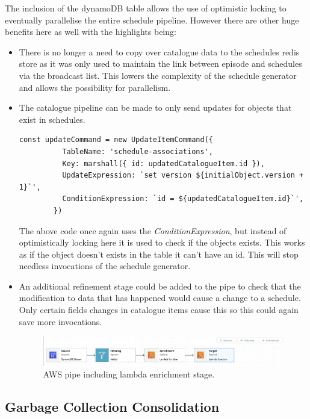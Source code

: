   The inclusion of the dynamoDB table allows the use of optimistic locking to eventually parallelise the entire schedule pipeline. However there are 
  other huge benefits here as well with the highlights being:

  \begin{itemize}
    \item There is no longer a need to copy over catalogue data to the schedules redis store as it was only used to maintain the link between episode and 
    schedules via the broadcast list. This lowers the complexity of the schedule generator and allows the possibility for parallelism.
    \item The catalogue pipeline can be made to only send updates for objects that exist in schedules. 
      \begin{lstlisting}[caption=SDK command sent by catalogue pipeline to ignore non schedule related catalogue items.]
        const updateCommand = new UpdateItemCommand({
          TableName: 'schedule-associations',
          Key: marshall({ id: updatedCatalogueItem.id }),
          UpdateExpression: `set version ${initialObject.version + 1}`',
          ConditionExpression: `id = ${updatedCatalogueItem.id}`',
        })
      \end{lstlisting} 
      The above code once again uses the \emph{ConditionExpression}, but instead of optimistically locking here it is used to check if the objects exists.
      This works as if the object doesn't exists in the table it can't have an id. This will stop needless invocations of the schedule generator.
    \item An additional refinement stage could be added to the pipe to check that the modification to data that has happened would cause a change to a
    schedule. Only certain fields changes in catalogue items cause this so this could again save more invocations.
  
      \begin{figure}[H]
        \centering
        \includegraphics[width=12cm]{assets/awsPipeFull.png}
        \caption{AWS pipe including lambda enrichment stage.}
        \label{fig:awsPipeFull}
      \end{figure}
  \end{itemize}

  \newpage
  \subsection{Garbage Collection Consolidation}
  \label{sec:garbageCollectorConsolidation}

